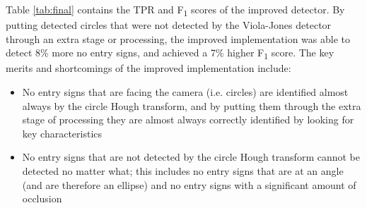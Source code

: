 \documentclass[twocolumn, 10pt, a4paper]{article}
\begin{document}
Table \ref{tab:final} contains the TPR and F\textsubscript{1} scores of the improved detector.
By putting detected circles that were not detected by the Viola-Jones detector through an extra stage or processing, the improved implementation was able to detect 8\% more no entry signs, and achieved a 7\% higher F\textsubscript{1} score.
The key merits and shortcomings of the improved implementation include:
\begin{itemize}
  \item No entry signs that are facing the camera (i.e. circles) are identified almost always by the circle Hough transform, and by putting them through the extra stage of processing they are almost always correctly identified by looking for key characteristics
  \item No entry signs that are not detected by the circle Hough transform cannot be detected no matter what; this includes no entry signs that are at an angle (and are therefore an ellipse) and no entry signs with a significant amount of occlusion
\end{itemize}

\clearpage

\onecolumn{\printbibliography}
    
\end{document}
